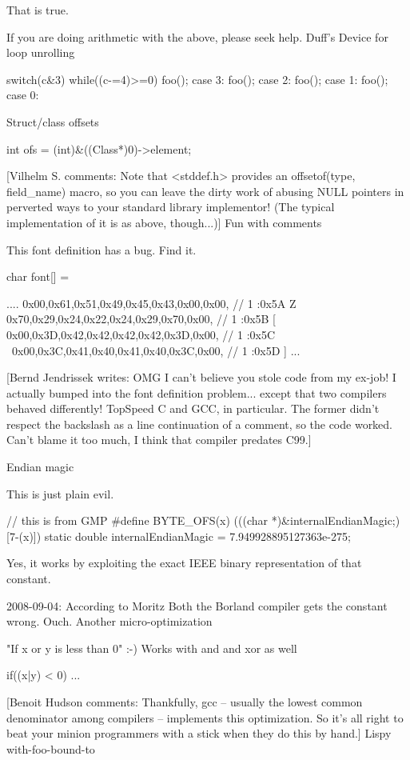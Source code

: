{{{{{{That is true.

If you are doing arithmetic with the above, please seek help.
Duff's Device for loop unrolling

        switch(c&3) while((c-=4)>=0) {
                foo(); case 3:
                foo(); case 2:
                foo(); case 1:
                foo(); case 0:
        }

Struct/class offsets

        int ofs = (int)&((Class*)0)->element;

[Vilhelm S. comments: Note that <stddef.h> provides an offsetof(type, field_name) macro, so you can leave the dirty work of abusing NULL pointers in perverted ways to your standard library implementor! (The typical implementation of it is as above, though...)]
Fun with comments

This font definition has a bug. Find it.

char font[] = {
....
0x00,0x61,0x51,0x49,0x45,0x43,0x00,0x00, // 1 :0x5A Z
0x70,0x29,0x24,0x22,0x24,0x29,0x70,0x00, // 1 :0x5B [
0x00,0x3D,0x42,0x42,0x42,0x42,0x3D,0x00, // 1 :0x5C \
0x00,0x3C,0x41,0x40,0x41,0x40,0x3C,0x00, // 1 :0x5D ]
...

[Bernd Jendrissek writes: OMG I can't believe you stole code from my ex-job! I actually bumped into the font definition problem... except that two compilers behaved differently! TopSpeed C and GCC, in particular. The former didn't respect the backslash as a line continuation of a comment, so the code worked. Can't blame it too much, I think that compiler predates C99.]


Endian magic

This is just plain evil.

        // this is from GMP
        #define BYTE_OFS(x) (((char *)&internalEndianMagic;)[7-(x)])
        static double internalEndianMagic = 7.949928895127363e-275;

Yes, it works by exploiting the exact IEEE binary representation of that constant.

2008-09-04: According to Moritz Both the Borland compiler gets the constant wrong. Ouch.
Another micro-optimization

"If x or y is less than 0" :-) Works with and and xor as well

        if((x|y) < 0) { ... }

[Benoit Hudson comments: Thankfully, gcc -- usually the lowest common denominator among compilers -- implements this optimization. So it's all right to beat your minion programmers with a stick when they do this by hand.]
Lispy with-foo-bound-to

}}}}}}}
